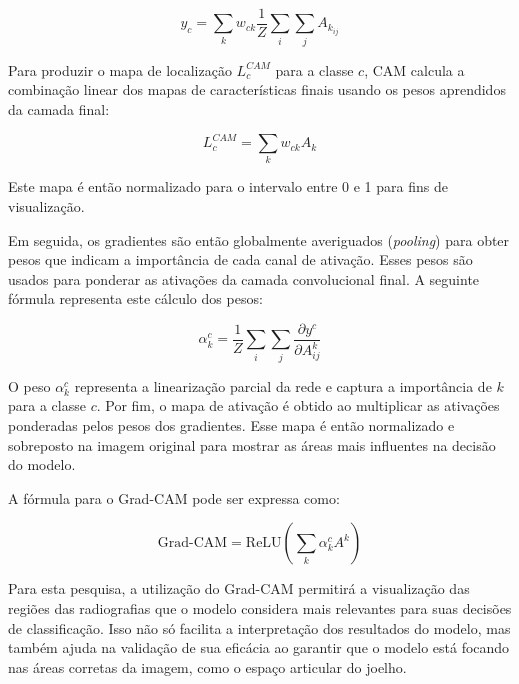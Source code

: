 \[
y_c = \sum_k w_{ck} \frac{1}{Z} \sum_i \sum_j A_{k_{ij}}
\]

Para produzir o mapa de localização \( L_c^{CAM} \) para a classe \( c \), CAM calcula a combinação linear dos mapas de características finais usando os pesos aprendidos da camada final:

\[
L_c^{CAM} = \sum_k w_{ck} A_k
\]

Este mapa é então normalizado para o intervalo entre 0 e 1 para fins de visualização.

Em seguida, os gradientes são então globalmente averiguados (\textit{pooling}) para obter pesos que indicam a importância de cada canal de ativação. Esses pesos são usados para ponderar as ativações da camada convolucional final. A seguinte fórmula representa este cálculo dos pesos:

\[
\alpha_{k}^{c} = \frac{1}{Z} \sum_i \sum_j \frac{\partial y^{c}}{\partial A_{ij}^{k}}
\]

O peso \( \alpha_{k}^{c} \) representa a linearização parcial da rede e captura a importância de \(k \) para a classe \(c \). Por fim, o mapa de ativação é obtido ao multiplicar as ativações ponderadas pelos pesos dos gradientes. Esse mapa é então normalizado e sobreposto na imagem original para mostrar as áreas mais influentes na decisão do modelo.

A fórmula para o Grad-CAM pode ser expressa como:

\[
\text{Grad-CAM} = \text{ReLU} \left( \sum_{k} \alpha_{k}^{c} A^{k} \right)
\]

Para esta pesquisa, a utilização do Grad-CAM permitirá a visualização das regiões das radiografias que o modelo considera mais relevantes para suas decisões de classificação. Isso não só facilita a interpretação dos resultados do modelo, mas também ajuda na validação de sua eficácia ao garantir que o modelo está focando nas áreas corretas da imagem, como o espaço articular do joelho.